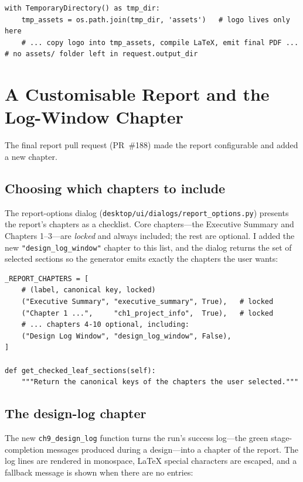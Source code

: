 \begin{lstlisting}[caption={Report assets confined to the temporary build directory (\texttt{report\_generator.py}, \texttt{generate\_report}).},label={lst:assetfix}]
with TemporaryDirectory() as tmp_dir:
    tmp_assets = os.path.join(tmp_dir, 'assets')   # logo lives only here
    # ... copy logo into tmp_assets, compile LaTeX, emit final PDF ...
# no assets/ folder left in request.output_dir
\end{lstlisting}

\section{A Customisable Report and the Log-Window Chapter}
The final report pull request (PR~\#188) made the report configurable and added a new chapter.

\subsection{Choosing which chapters to include}
The report-options dialog (\texttt{desktop/ui/dialogs/report\_options.py}) presents the report's
chapters as a checklist. Core chapters---the Executive Summary and Chapters 1--3---are
\emph{locked} and always included; the rest are optional. I added the new
\texttt{"design\_log\_window"} chapter to this list, and the dialog returns the set of selected
sections so the generator emits exactly the chapters the user wants:

\begin{lstlisting}[caption={The report chapter checklist, with locked and optional entries (\texttt{report\_options.py}).},label={lst:reportopts}]
_REPORT_CHAPTERS = [
    # (label, canonical key, locked)
    ("Executive Summary", "executive_summary", True),   # locked
    ("Chapter 1 ...",     "ch1_project_info",  True),   # locked
    # ... chapters 4-10 optional, including:
    ("Design Log Window", "design_log_window", False),
]

def get_checked_leaf_sections(self):
    """Return the canonical keys of the chapters the user selected."""
\end{lstlisting}

\subsection{The design-log chapter}
The new \texttt{ch9\_design\_log} function turns the run's success log---the green
stage-completion messages produced during a design---into a chapter of the report. The log
lines are rendered in monospace, LaTeX special characters are escaped, and a fallback message
is shown when there are no entries:

